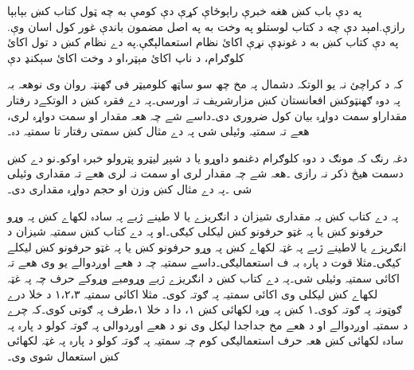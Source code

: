 په دې باب کښ هغه خبرې راېوځاې کړې دې کومې به چه ټول کتاب کښ بېابېا رازې.امېد دې چه د کتاب لوستلو په وخت به په اصل مضمون باندې غور کول اسان وې.
په دې کتاب کښ به د غونډې نړې اکائ نظام  استعمالېګې.په دے نظام کښ د تول اکائ کلوګرام، د ناپ اکائ مېټر،او د وخت اکائ سېکنډ دې 

      
کہ د کراچئ نہ یو الوتکہ دشمال پہ مخ چھ سو ساټھ کلومیټر فی ګھنټہ روان وی نوھعہ بہ پہ دوہ ګھنټوکښ افعانستان کښ مزارشریف تہ اورسی۔پہ دے فقرہ کښ د الوتکےد رفتار مقداراو سمت دواړہ بیان کول ضروری دی۔داسے شے چہ ھعہ مقدار او سمت دواړہ لری، ھعے تہ سمتیہ وئیلی شی پہ دے مثال کښ سمتی رفتار تا سمتیہ دہ۔

دغہ رنګ کہ مونګ د دوہ کلوګرام دغنمو داوړو یا د شپږ لیټرو پټرولو خبرہ اوکو۔نو دے کښ دسمت ھیڅ ذکر نہ رازی ۔ھعہ شے چہ مقدار لری او سمت نہ لری ھعے تہ مقداری وئیلی شی ۔پہ دے مثال کښ وزن او حجم دواړہ مقداری دی۔

پہ دے کتاب کښ بہ مقداری شیزان د انګریزے یا لا طینے ژبے پہ سادہ لکھاے کښ پہ وړو حرفونو کښ یا پہ غټو حرفونو کښ لیکلی کیګی۔او پہ دے کتاب کښ سمتیہ شیزان د انګریزے یا لاطینے ژبے پہ غټہ لکھاے کښ پہ وړو حرفونو کښ یا پہ غټو حرفونو کښ لیکلے کیګی۔مثلا قوت د پارہ بہ ف استعمالیګی۔داسے سمتیہ چہ د ھعے اوږدوالے یو وی ھعے تہ اکائی سمتیہ وئیلی شی۔پہ دے کتاب کښ د انګریزے ژبے وړومبے وړوکے حرف چہ پہ غټہ  لکھاے کښ لیکلی وی اکائی سمتیہ پہ ګوتہ کوی۔ مثلا اکائی سمتیہ  ۱،۲،۳ د خلا درے ګوټونہ پہ ګوتہ کوی۔۱ کښ پہ وړہ لکھائی کښ ۱، دا د خلا ۱،طرف پہ ګوتی کوی۔کہ چرے د سمتیہ اوږدوالے او د ھعے مخ جداجدا لیکل وی نو د ھعے اوږدوالی پہ ګوتہ کولو د پارہ پہ سادہ لکھائی کښ ھعہ حرف استعمالیګی کوم چہ سمتیہ پہ ګوتہ کولو د پارہ پہ غټہ لکھائی کښ استعمال شوی وی۔

 


